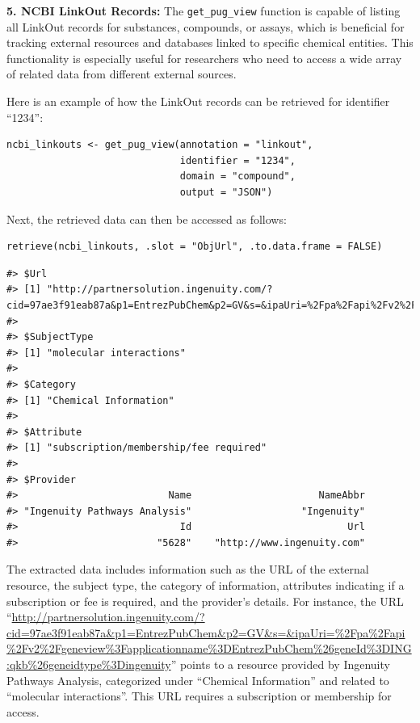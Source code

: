 \textbf{5. NCBI LinkOut Records:} The \texttt{get\_pug\_view} function is capable of listing all LinkOut records for substances, compounds, or assays, which is beneficial for tracking external resources and databases linked to specific chemical entities. This functionality is especially useful for researchers who need to access a wide array of related data from different external sources.

Here is an example of how the LinkOut records can be retrieved for identifier ``1234'':

\begin{verbatim}
ncbi_linkouts <- get_pug_view(annotation = "linkout", 
                              identifier = "1234", 
                              domain = "compound", 
                              output = "JSON")
\end{verbatim}

Next, the retrieved data can then be accessed as follows:

\begin{verbatim}
retrieve(ncbi_linkouts, .slot = "ObjUrl", .to.data.frame = FALSE)
\end{verbatim}

\begin{verbatim}
#> $Url
#> [1] "http://partnersolution.ingenuity.com/?cid=97ae3f91eab87a&p1=EntrezPubChem&p2=GV&s=&ipaUri=%2Fpa%2Fapi%2Fv2%2Fgeneview%3Fapplicationname%3DEntrezPubChem%26geneId%3DING:qkb%26geneidtype%3Dingenuity"
#> 
#> $SubjectType
#> [1] "molecular interactions"
#> 
#> $Category
#> [1] "Chemical Information"
#> 
#> $Attribute
#> [1] "subscription/membership/fee required"
#> 
#> $Provider
#>                          Name                      NameAbbr 
#> "Ingenuity Pathways Analysis"                   "Ingenuity" 
#>                            Id                           Url 
#>                        "5628"    "http://www.ingenuity.com"
\end{verbatim}

The extracted data includes information such as the URL of the external resource, the subject type, the category of information, attributes indicating if a subscription or fee is required, and the provider's details. For instance, the URL ``\url{http://partnersolution.ingenuity.com/?cid=97ae3f91eab87a&p1=EntrezPubChem&p2=GV&s=&ipaUri=\%2Fpa\%2Fapi\%2Fv2\%2Fgeneview\%3Fapplicationname\%3DEntrezPubChem\%26geneId\%3DING:qkb\%26geneidtype\%3Dingenuity}'' points to a resource provided by Ingenuity Pathways Analysis, categorized under ``Chemical Information'' and related to ``molecular interactions''. This URL requires a subscription or membership for access.


